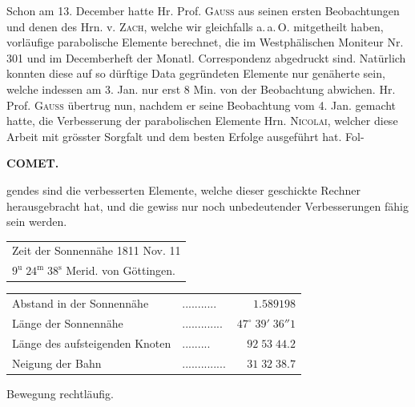 \noindent Schon am 13. December hatte Hr. Prof. \textsc{Gauss} aus seinen ersten Beobachtungen und denen des Hrn. v. \textsc{Zach}, welche wir gleichfalls a.\,a.\,O. mitgetheilt haben, vorläufige parabolische Elemente berechnet, die im Westphälischen Moniteur Nr.\,301 und im Decemberheft der Monatl. Correspondenz abgedruckt sind. Natürlich konnten diese auf so dürftige Data gegründeten Elemente nur genäherte sein, welche indessen am 3. Jan. nur erst 8 Min. von der Beobachtung abwichen. Hr. Prof. \textsc{Gauss} übertrug nun, nachdem er seine Beobachtung vom 4. Jan. gemacht hatte, die Verbesserung der parabolischen Elemente Hrn. \textsc{Nicolai}, welcher diese Arbeit mit grösster Sorgfalt und dem besten Erfolge ausgeführt hat. Fol-
\par
{}
\thispagestyle{gaussVIGathering62}
\clearpage
\thispagestyle{empty}
\noindent{}%
%
\parbox[t]{\dimexpr\linewidth-24mm\relax}{\centering\footnotesize\bfseries COMET.\par}%
\makebox[12mm][r]{}\par\nobreak\medskip
\noindent gendes sind die verbesserten Elemente, welche dieser geschickte Rechner herausgebracht hat, und die gewiss nur noch unbedeutender Verbesserungen fähig sein werden.

\begin{center}\fontsize{10}{12}\selectfont\setlength{\tabcolsep}{4pt}\renewcommand{\arraystretch}{1.15}\begin{tabular}{l}
Zeit der Sonnennähe 1811 Nov. 11\\
\quad $9^{\mathrm u}\;24^{\mathrm m}\;38^{\mathrm s}$ Merid. von Göttingen.\\
\end{tabular}\end{center}
\begin{center}\fontsize{10}{12}\selectfont\setlength{\tabcolsep}{3pt}\renewcommand{\arraystretch}{1.15}\begin{tabular}{llr}
Abstand in der Sonnennähe & .\;.\;.\;.\;.\;.\;.\;.\;.\;.\;. & $1.589198$\\
Länge der Sonnennähe & .\;.\;.\;.\;.\;.\;.\;.\;.\;.\;.\;.\;. & $47^\circ\;39'\;36''1$\\
Länge des aufsteigenden Knoten & .\;.\;.\;.\;.\;.\;.\;.\;. & $92\;53\;44.2$\\
Neigung der Bahn & .\;.\;.\;.\;.\;.\;.\;.\;.\;.\;.\;.\;.\;. & $31\;32\;38.7$\\
\end{tabular}\end{center}
\noindent Bewegung rechtläufig.

